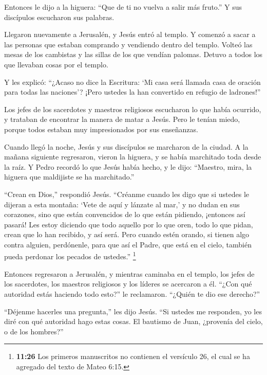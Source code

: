  Entonces le dijo a la higuera: ``Que de ti no vuelva a
salir más fruto.'' Y sus discípulos escucharon sus palabras.

 Llegaron nuevamente a Jerusalén, y Jesús entró al templo.
Y comenzó a sacar a las personas que estaban comprando y vendiendo
dentro del templo. Volteó las mesas de los cambistas y las sillas de los
que vendían palomas.  Detuvo a todos los que llevaban cosas
por el templo.

 Y les explicó: ``¿Acaso no dice la Escritura: `Mi casa
será llamada casa de oración para todas las naciones'? ¡Pero ustedes la
han convertido en refugio de ladrones!''

 Los jefes de los sacerdotes y maestros religiosos
escucharon lo que había ocurrido, y trataban de encontrar la manera de
matar a Jesús. Pero le tenían miedo, porque todos estaban muy
impresionados por sus enseñanzas.

 Cuando llegó la noche, Jesús y sus discípulos se marcharon
de la ciudad.  A la mañana siguiente regresaron, vieron la
higuera, y se había marchitado toda desde la raíz.  Y Pedro
recordó lo que Jesús había hecho, y le dijo: ``Maestro, mira, la higuera
que maldijiste se ha marchitado.''

 ``Crean en Dios,'' respondió Jesús. 
``Créanme cuando les digo que si ustedes le dijeran a esta montaña:
`Vete de aquí y lánzate al mar,' y no dudan en sus corazones, sino que
están convencidos de lo que están pidiendo, ¡entonces así pasará!
 Les estoy diciendo que todo aquello por lo que oren, todo
lo que pidan, crean que lo han recibido, y así será.  Pero
cuando estén orando, si tienen algo contra alguien, perdónenle, para que
así el Padre, que está en el cielo, también pueda perdonar los pecados
de ustedes.''  \footnote{\textbf{11:26} Los primeros
  manuscritos no contienen el versículo 26, el cual se ha agregado del
  texto de Mateo 6:15.}

 Entonces regresaron a Jerusalén, y mientras caminaba en el
templo, los jefes de los sacerdotes, los maestros religiosos y los
líderes se acercaron a él.  ``¿Con qué autoridad estás
haciendo todo esto?'' le reclamaron. ``¿Quién te dio ese derecho?''

 ``Déjenme hacerles una pregunta,'' les dijo Jesús. ``Si
ustedes me responden, yo les diré con qué autoridad hago estas cosas.
 El bautismo de Juan, ¿provenía del cielo, o de los
hombres?''


